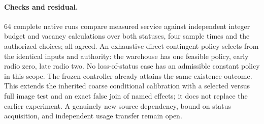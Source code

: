 \documentclass[11pt]{article}
\begin{document}
\paragraph{Checks and residual.}
64 complete native runs compare measured service against independent
integer budget and vacancy calculations over both statuses, four sample
times and the authorized choices; all agreed. An exhaustive direct
contingent policy selects from the identical inputs and authority: the
warehouse has one feasible policy, early radio zero, late radio two.
No loss-of-status case has an admissible constant policy in this scope.
The frozen controller already attains the same existence outcome. This
extends the inherited coarse conditional calibration with a selected
versus full image test and an exact false join of named effects; it does
not replace the earlier experiment. A genuinely new source dependency,
bound on status acquisition, and independent usage transfer remain open.
\end{document}
